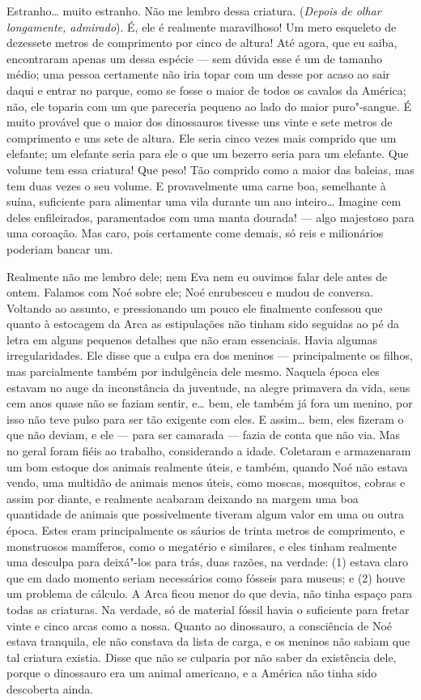 Estranho\ldots{} muito estranho. Não me lembro dessa criatura. (\textit{Depois de olhar longamente, admirado}).
É, ele é realmente maravilhoso! Um mero esqueleto de dezessete metros de comprimento por
cinco de altura! Até agora, que eu saiba, encontraram apenas um dessa espécie --- sem
dúvida esse é um de tamanho médio; uma pessoa certamente não iria topar com um
desse por acaso ao sair daqui e entrar no parque, como se fosse o maior de todos
os cavalos da América; não, ele toparia com um que pareceria pequeno ao lado do
maior puro"-sangue. É muito provável que o maior dos dinossauros tivesse uns vinte e sete
metros de comprimento e uns sete de altura. Ele seria cinco vezes mais comprido que
um elefante; um elefante seria para ele o que um bezerro seria para um elefante.
Que volume tem essa criatura! Que peso! Tão comprido como a maior das baleias, mas
tem duas vezes o seu volume. E provavelmente uma carne boa, semelhante à suína, 
suficiente para alimentar uma vila durante um ano inteiro\ldots{} Imagine cem deles
enfileirados, paramentados com uma manta dourada! --- algo majestoso para uma coroação. 
Mas caro, pois certamente come demais, só reis e
milionários poderiam bancar um.

Realmente não me lembro dele; nem Eva nem eu ouvimos falar dele antes de ontem.
Falamos com Noé sobre ele; Noé enrubesceu e mudou de conversa. Voltando ao
assunto, e pressionando um pouco ele finalmente confessou que quanto à
estocagem da Arca as estipulações não tinham sido seguidas ao pé da letra em alguns
pequenos detalhes que não eram essenciais. Havia algumas irregularidades. Ele disse
que a culpa era dos meninos --- principalmente os filhos, mas parcialmente também
por indulgência dele mesmo. Naquela época eles estavam no auge da inconstância da
juventude, na alegre primavera da vida, seus cem anos quase não se faziam
sentir, e\ldots{} bem, ele também já fora um menino, por isso não teve pulso para ser
tão exigente com eles. E assim\ldots{} bem, eles fizeram o que não deviam,
e ele --- para ser camarada --- fazia de conta que não via. Mas no geral foram
fiéis ao trabalho, considerando a idade. Coletaram e armazenaram um bom
estoque dos animais realmente úteis, e também, quando Noé não estava vendo, uma
multidão de animais menos úteis, como moscas, mosquitos, cobras e assim por
diante, e realmente acabaram deixando na margem uma boa quantidade de animais que
possivelmente tiveram algum valor em uma ou outra época. Estes
eram principalmente os sáurios de trinta metros de comprimento, e monstruosos
mamíferos, como o megatério e similares, e eles tinham realmente uma desculpa para
deixá"-los para trás, duas razões, na verdade: (1) estava claro que em dado momento
seriam necessários como fósseis para museus; e (2) houve um problema de cálculo. A
Arca ficou menor do que devia, não tinha espaço para todas as
criaturas. Na verdade, só de material fóssil havia o suficiente para fretar vinte e cinco
arcas como a nossa. Quanto ao dinossauro, a consciência de Noé estava tranquila,
ele não constava da lista de carga, e os meninos não sabiam que
tal criatura existia. Disse que não se culparia por não saber da existência dele,
porque o dinossauro era um animal americano, e a América não tinha sido descoberta
ainda.

